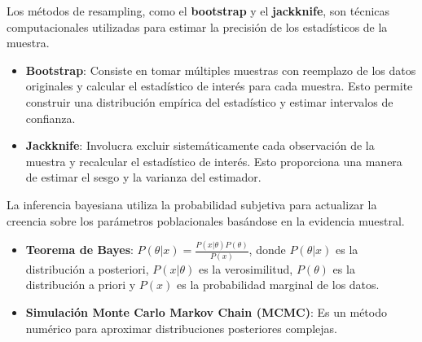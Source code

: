 \documentclass[
  letterpaper,
  DIV=11,
  numbers=noendperiod]{scrreprt}
\providecommand{\tightlist}{%
  \setlength{\itemsep}{0pt}\setlength{\parskip}{0pt}}\usepackage{longtable,booktabs,array}
\begin{document}
\begin{tcolorbox}[enhanced jigsaw, arc=.35mm, breakable, coltitle=black, left=2mm, opacityback=0, bottomtitle=1mm, colbacktitle=quarto-callout-note-color!10!white, title=\textcolor{quarto-callout-note-color}{\faInfo}\hspace{0.5em}{Métodos de resampling}, titlerule=0mm, colback=white, colframe=quarto-callout-note-color-frame, bottomrule=.15mm, rightrule=.15mm, opacitybacktitle=0.6, toptitle=1mm, toprule=.15mm, leftrule=.75mm]

Los métodos de resampling, como el \textbf{bootstrap} y el
\textbf{jackknife}, son técnicas computacionales utilizadas para estimar
la precisión de los estadísticos de la muestra.

\begin{itemize}
\item
  \textbf{Bootstrap}: Consiste en tomar múltiples muestras con reemplazo
  de los datos originales y calcular el estadístico de interés para cada
  muestra. Esto permite construir una distribución empírica del
  estadístico y estimar intervalos de confianza.
\item
  \textbf{Jackknife}: Involucra excluir sistemáticamente cada
  observación de la muestra y recalcular el estadístico de interés. Esto
  proporciona una manera de estimar el sesgo y la varianza del
  estimador.
\end{itemize}

\end{tcolorbox}

\begin{tcolorbox}[enhanced jigsaw, arc=.35mm, breakable, coltitle=black, left=2mm, opacityback=0, bottomtitle=1mm, colbacktitle=quarto-callout-note-color!10!white, title=\textcolor{quarto-callout-note-color}{\faInfo}\hspace{0.5em}{Métodos bayesianos}, titlerule=0mm, colback=white, colframe=quarto-callout-note-color-frame, bottomrule=.15mm, rightrule=.15mm, opacitybacktitle=0.6, toptitle=1mm, toprule=.15mm, leftrule=.75mm]

La inferencia bayesiana utiliza la probabilidad subjetiva para
actualizar la creencia sobre los parámetros poblacionales basándose en
la evidencia muestral.

\begin{itemize}
\tightlist
\item
  \textbf{Teorema de Bayes}:
  \(P( \theta |x) = \frac{P(x | \theta)P( \theta)}{P(x)}\), donde
  \(P(\theta|x)\) es la distribución a posteriori, \(P(x|\theta)\) es la
  verosimilitud, \(P(\theta)\) es la distribución a priori y \(P(x)\) es
  la probabilidad marginal de los datos.
\item
  \textbf{Simulación Monte Carlo Markov Chain (MCMC)}: Es un método
  numérico para aproximar distribuciones posteriores complejas.
\end{itemize}

\end{tcolorbox}
\end{document}
